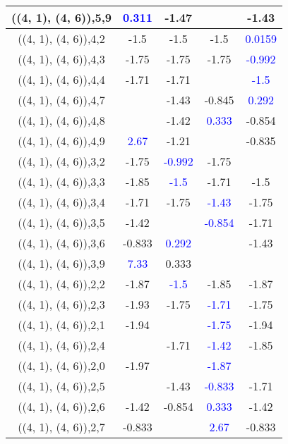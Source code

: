 \documentclass{article}
\begin{document}
\begin{center}
\begin{longtable}{|c|c|c|c|c|}
        	((4, 1), (4, 6)),5,9& \textcolor{blue}{0.311}&-1.47&&-1.43\\
        	\hline
        	((4, 1), (4, 6)),4,2&-1.5&-1.5&-1.5& \textcolor{blue}{0.0159}\\
        	\hline
        	((4, 1), (4, 6)),4,3&-1.75&-1.75&-1.75& \textcolor{blue}{-0.992}\\
        	\hline
        	((4, 1), (4, 6)),4,4&-1.71&-1.71&& \textcolor{blue}{-1.5}\\
        	\hline
        	((4, 1), (4, 6)),4,7&&-1.43&-0.845& \textcolor{blue}{0.292}\\
        	\hline
        	((4, 1), (4, 6)),4,8&&-1.42& \textcolor{blue}{0.333}&-0.854\\
        	\hline
        	((4, 1), (4, 6)),4,9& \textcolor{blue}{2.67}&-1.21&&-0.835\\
        	\hline
        	((4, 1), (4, 6)),3,2&-1.75& \textcolor{blue}{-0.992}&-1.75&\\
        	\hline
        	((4, 1), (4, 6)),3,3&-1.85& \textcolor{blue}{-1.5}&-1.71&-1.5\\
        	\hline
        	((4, 1), (4, 6)),3,4&-1.71&-1.75& \textcolor{blue}{-1.43}&-1.75\\
        	\hline
        	((4, 1), (4, 6)),3,5&-1.42&& \textcolor{blue}{-0.854}&-1.71\\
        	\hline
        	((4, 1), (4, 6)),3,6&-0.833& \textcolor{blue}{0.292}&&-1.43\\
        	\hline
        	((4, 1), (4, 6)),3,9& \textcolor{blue}{7.33}&0.333&&\\
        	\hline
        	((4, 1), (4, 6)),2,2&-1.87& \textcolor{blue}{-1.5}&-1.85&-1.87\\
        	\hline
        	((4, 1), (4, 6)),2,3&-1.93&-1.75& \textcolor{blue}{-1.71}&-1.75\\
        	\hline
        	((4, 1), (4, 6)),2,1&-1.94&& \textcolor{blue}{-1.75}&-1.94\\
        	\hline
        	((4, 1), (4, 6)),2,4&&-1.71& \textcolor{blue}{-1.42}&-1.85\\
        	\hline
        	((4, 1), (4, 6)),2,0&-1.97&& \textcolor{blue}{-1.87}&\\
        	\hline
        	((4, 1), (4, 6)),2,5&&-1.43& \textcolor{blue}{-0.833}&-1.71\\
        	\hline
        	((4, 1), (4, 6)),2,6&-1.42&-0.854& \textcolor{blue}{0.333}&-1.42\\
        	\hline
        	((4, 1), (4, 6)),2,7&-0.833&& \textcolor{blue}{2.67}&-0.833\\

\end{longtable}
\end{center}
\end{document}
